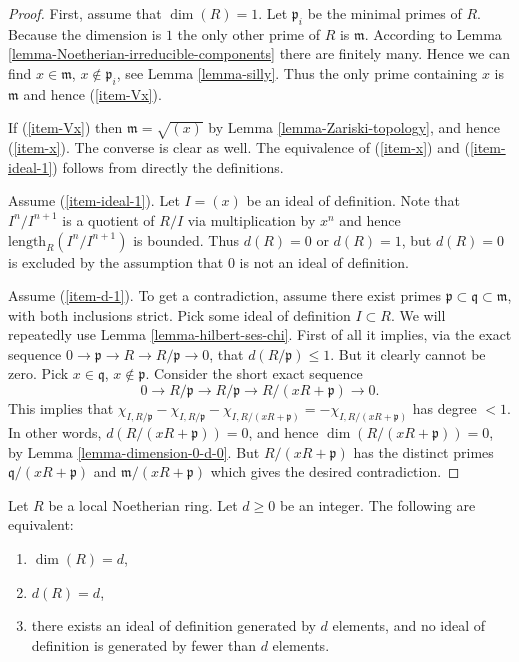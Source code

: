 \begin{proof}
First, assume that $\dim(R) = 1$.
Let $\mathfrak p_i$ be the minimal primes of $R$.
Because the dimension is $1$ the only other prime of $R$
is $\mathfrak m$.
According to Lemma \ref{lemma-Noetherian-irreducible-components}
there are finitely many. Hence we can find $x \in \mathfrak m$,
$x \not \in \mathfrak p_i$, see Lemma \ref{lemma-silly}.
Thus the only prime containing $x$ is $\mathfrak m$ and
hence (\ref{item-Vx}).

\medskip\noindent
If (\ref{item-Vx}) then $\mathfrak m = \sqrt{(x)}$ by
Lemma \ref{lemma-Zariski-topology}, and hence (\ref{item-x}).
The converse is clear as well.
The equivalence of (\ref{item-x}) and (\ref{item-ideal-1}) follows
from directly the definitions.

\medskip\noindent
Assume (\ref{item-ideal-1}).
Let $I = (x)$ be an ideal of definition.
Note that $I^n/I^{n + 1}$ is a quotient of $R/I$ via multiplication
by $x^n$ and hence $\text{length}_R(I^n/I^{n + 1})$ is bounded.
Thus $d(R) = 0$ or $d(R) = 1$, but $d(R) = 0$ is excluded
by the assumption that $0$ is not an ideal of definition.

\medskip\noindent
Assume (\ref{item-d-1}). To get a contradiction, assume there
exist primes $\mathfrak p \subset \mathfrak q \subset \mathfrak m$,
with both inclusions strict. Pick some ideal of definition $I \subset R$.
We will repeatedly use
Lemma \ref{lemma-hilbert-ses-chi}. First of all
it implies, via the exact sequence
$0 \to \mathfrak p \to R \to R/\mathfrak p \to 0$,
that $d(R/\mathfrak p) \leq 1$. But it clearly cannot
be zero. Pick $x\in \mathfrak q$, $x\not \in \mathfrak p$.
Consider the short exact sequence
$$
0 \to R/\mathfrak p \to R/\mathfrak p \to R/(xR + \mathfrak p) \to 0.
$$
This implies that $\chi_{I, R/\mathfrak p} - \chi_{I, R/\mathfrak p}
- \chi_{I, R/(xR + \mathfrak p)} = - \chi_{I, R/(xR + \mathfrak p)}$
has degree $ < 1$. In other words, $d(R/(xR + \mathfrak p)) = 0$,
and hence $\dim(R/(xR + \mathfrak p)) = 0$, by
Lemma \ref{lemma-dimension-0-d-0}. But $R/(xR + \mathfrak p)$
has the distinct primes $\mathfrak q/(xR + \mathfrak p)$ and
$\mathfrak m/(xR + \mathfrak p)$ which gives the desired contradiction.
\end{proof}

\begin{proposition}
\label{proposition-dimension}
Let $R$ be a local Noetherian ring. Let $d \geq 0$ be an integer.
The following are equivalent:
\begin{enumerate}
\item
\label{item-dim-d}
$\dim(R) = d$,
\item
\label{item-d-d}
$d(R) = d$,
\item
\label{item-ideal-d}
there exists an ideal of definition generated by $d$ elements,
and no ideal of definition is generated by fewer than $d$ elements.
\end{enumerate}
\end{proposition}

